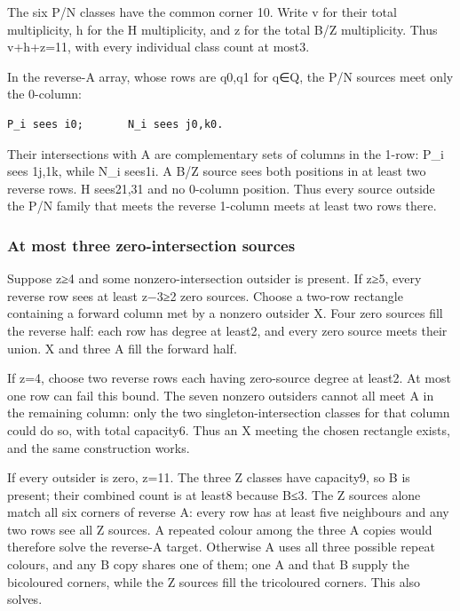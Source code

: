 \documentclass[
  10pt,
]{article}
\begin{document}
The six P/N classes have the common corner 10. Write v for their total
multiplicity, h for the H multiplicity, and z for the total B/Z
multiplicity. Thus v+h+z=11, with every individual class count at most3.

In the reverse-A array, whose rows are q0,q1 for q∈Q, the P/N sources
meet only the 0-column:

\begin{verbatim}
P_i sees i0;       N_i sees j0,k0.
\end{verbatim}

Their intersections with A are complementary sets of columns in the
1-row: P\_i sees 1j,1k, while N\_i sees1i. A B/Z source sees both
positions in at least two reverse rows. H sees21,31 and no 0-column
position. Thus every source outside the P/N family that meets the
reverse 1-column meets at least two rows there.

\hypertarget{at-most-three-zero-intersection-sources}{%
\subsubsection*{At most three zero-intersection
sources}\label{at-most-three-zero-intersection-sources}}

Suppose z≥4 and some nonzero-intersection outsider is present. If z≥5,
every reverse row sees at least z−3≥2 zero sources. Choose a two-row
rectangle containing a forward column met by a nonzero outsider X. Four
zero sources fill the reverse half: each row has degree at least2, and
every zero source meets their union. X and three A fill the forward
half.

If z=4, choose two reverse rows each having zero-source degree at
least2. At most one row can fail this bound. The seven nonzero outsiders
cannot all meet A in the remaining column: only the two
singleton-intersection classes for that column could do so, with total
capacity6. Thus an X meeting the chosen rectangle exists, and the same
construction works.

If every outsider is zero, z=11. The three Z classes have capacity9, so
B is present; their combined count is at least8 because B≤3. The Z
sources alone match all six corners of reverse A: every row has at least
five neighbours and any two rows see all Z sources. A repeated colour
among the three A copies would therefore solve the reverse-A target.
Otherwise A uses all three possible repeat colours, and any B copy
shares one of them; one A and that B supply the bicoloured corners,
while the Z sources fill the tricoloured corners. This also solves.
\end{document}
